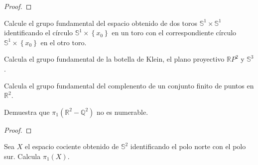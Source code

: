 \documentclass[12pt]{report}
\newcounter{it}
\theoremstyle{largebreak}
\begin{document}
    \begin{proof}
        
    \end{proof}

    \begin{excer}
        Calcule el grupo fundamental del espacio obtenido de dos toros $\mathbb{S}^1\times\mathbb{S}^1$ identificando el círculo $\mathbb{S}^1\times\left\{x_0\right\}$ en un toro con el correspondiente círculo $\mathbb{S}^1\times\left\{x_0\right\}$ en el otro toro.
    \end{excer}

    \begin{sol}
        
    \end{sol}

    \begin{excer}
        Calcula el grupo fundamental de la botella de Klein, el plano proyectivo $\mathbb{R}P^2$ y $\mathbb{S}^3$.
    \end{excer}

    \begin{sol}
        
    \end{sol}

    \begin{excer}
        Calcula el grupo fundamental del complenento de un conjunto finito de puntos en $\mathbb{R}^2$.
    \end{excer}

    \begin{sol}
        
    \end{sol}

    \begin{excer}
        Demuestra que $\pi_1(\mathbb{R}^2-\mathbb{Q}^2)$ no es numerable.
    \end{excer}

    \begin{proof}
        
    \end{proof}

    \begin{excer}
        Sea $X$ el espacio cociente obtenido de $\mathbb{S}^2$ identificando el polo norte con el polo sur. Calcula $\pi_1(X)$.
    \end{excer}

    \begin{sol}
        
    \end{sol}
\end{document}
